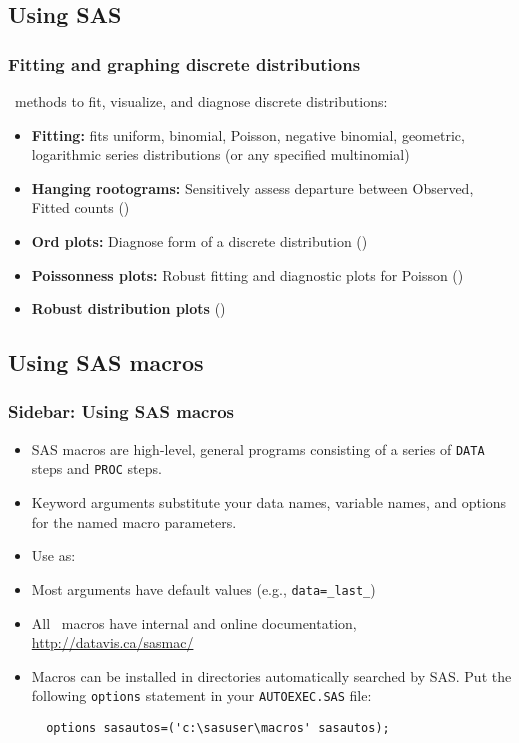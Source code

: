 \subsection{Using SAS}
\begin{frame}
  \frametitle{Fitting and graphing discrete distributions}
  \begin{block}
      \VCD\ methods to fit, visualize, and diagnose discrete distributions:
  \end{block}

  \begin{itemize}
	\item{\large\bfseries Fitting:}  fits uniform, binomial,
 Poisson, negative binomial, geometric,  logarithmic series
 distributions (or any specified multinomial)

	\item{\large\bfseries Hanging rootograms:} Sensitively assess departure between Observed, Fitted
counts ()
	\item{\large\bfseries Ord plots:} Diagnose form of a discrete distribution ()
	\item{\large\bfseries Poissonness plots:} Robust fitting and diagnostic plots for Poisson
()
	\item{\large\bfseries Robust distribution plots} ()
  \end{itemize}
\end{frame}

\subsection{Using SAS macros}
\begin{frame}[fragile]
  \frametitle{Sidebar: Using SAS macros}
  \begin{itemize}
    \item SAS macros are high-level, general programs consisting of a series of
	\texttt{DATA} steps and \texttt{PROC} steps.
	\item Keyword arguments substitute your data names, variable names, and
	options for the named macro parameters.
	\item Use as:
\begin{Code}
\end{Code}
	\item Most arguments have default values (e.g., \texttt{data=\_last\_})
	\item All \VCD\ macros have internal and online documentation,
	\url{http://datavis.ca/sasmac/}
	\item Macros can be installed in directories automatically searched by SAS.
	Put the following \texttt{options} statement in your \texttt{AUTOEXEC.SAS} file:
\begin{verbatim}
  options sasautos=('c:\sasuser\macros' sasautos);
\end{verbatim}

  \end{itemize}
\end{frame}

